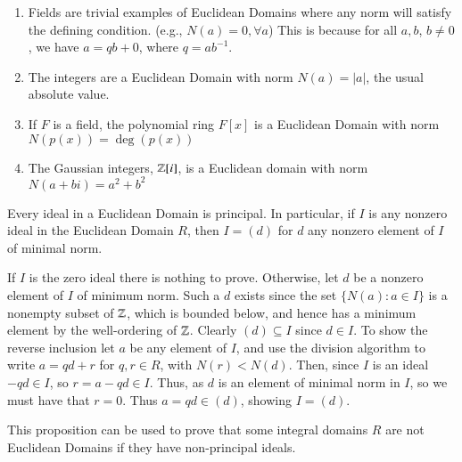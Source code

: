 \documentclass[12pt, a4paper, twoside, openright, titlepage]{book}
\begin{document}
\begin{eg}{}{}
    \leavevmode
    \begin{enumerate}
        \item Fields are trivial examples of Euclidean Domains where any norm will satisfy the defining condition. (e.g., $N(a) = 0,\forall a$) This is because for all $a,b$, $b\neq 0$, we have $a = qb+0$, where $q = ab^{-1}$.
        \item The integers are a Euclidean Domain with norm $N(a) = |a|$, the usual absolute value.
        \item If $F$ is a field, the polynomial ring $F[x]$ is a Euclidean Domain with norm $N(p(x)) = \deg(p(x))$
        \item The Gaussian integers, $\mathbb Z[i]$, is a Euclidean domain with norm $N(a+bi) = a^2+b^2$
    \end{enumerate}
\end{eg}


\begin{prop}{}{}
    Every ideal in a Euclidean Domain is principal. In particular, if $I$ is any nonzero ideal in the Euclidean Domain $R$, then $I = (d)$ for $d$ any nonzero element of $I$ of minimal norm.
\end{prop}
\begin{proof*}{}{}
    If $I$ is the zero ideal there is nothing to prove. Otherwise, let $d$ be a nonzero element of $I$ of minimum norm. Such a $d$ exists since the set $\{N(a):a \in I\}$ is a nonempty subset of $\mathbb Z$, which is bounded below, and hence has a minimum element by the well-ordering of $\mathbb Z$. Clearly $(d) \subseteq I$ since $d \in I$. To show the reverse inclusion let $a$ be any element of $I$, and use the division algorithm to write $a = qd + r$ for $q,r \in R$, with $N(r) < N(d)$. Then, since $I$ is an ideal $-qd \in I$, so $r = a-qd \in I$. Thus, as $d$ is an element of minimal norm in $I$, so we must have that $r = 0$. Thus $a = qd \in (d)$, showing $I = (d)$.
\end{proof*}

\begin{rmk}{}{}
    This proposition can be used to prove that some integral domains $R$ are not Euclidean Domains if they have non-principal ideals.
\end{rmk}
\end{document}
